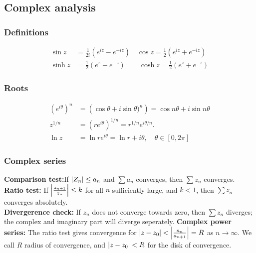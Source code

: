 \documentclass[a4paper, 10pt]{article}
\begin{document}
\tiny
\begin{multicols*}{3}
\begin{mdframed}
\subsection*{Complex analysis}
\end{mdframed}
\subsubsection*{Definitions}
\begin{align*}
  \sin{z} &= \frac{1}{2i}\left(e^{iz}-e^{-iz}\right)\quad
  \cos{z} = \frac{1}{2}\left(e^{iz}+e^{-iz}\right)\\
  \sinh{z} &= \frac{1}{2}\left(e^{z}-e^{-z}\right)\qquad
  \cosh{z} = \frac{1}{2}\left(e^{z}+e^{-z}\right)
\end{align*}

\subsubsection*{Roots}
\begin{align*}
  \left(e^{i\theta}\right)^n &= \left(\cos{\theta} + i \sin{\theta})^n\right) = \cos{n\theta} + i\sin{n\theta}\\
  z^{1/n} &= \left(re^{i\theta}\right)^{1/n} = r^{1/n}e^{i\theta/n}.\\
  \ln{z} &= \ln{re^{i\theta}} = \ln{r} + i\theta, \quad \theta \in [0, 2\pi]
\end{align*}


\subsubsection*{Complex series}
\textbf{Comparison test:}If $\abs{Z_n} \leq a_n$ and $\sum a_n$ converges, then $\sum z_n$ converges.\\
\textbf{Ratio test:} If $\abs{\frac{z_{n+1}}{z_n}} \leq k$ for all $n$ sufficiently large, and $k<1$, then $\sum z_n$ converges absolutely.\\
\textbf{Divergerence check:} If $z_n$ does not converge towards zero, then $\sum z_n$ diverges; the complex and imaginary part will diverge seperately.
\textbf{Complex power series:} The ratio test gives convergence for $\abs{z-z_0} < \abs{\frac{a_n}{a_{n+1}}} = R$ as $n\rightarrow \infty$. We call $R$ radius of convergence, and $\abs{z-z_0} < R$ for the disk of convergence.


\end{multicols*}
\end{document}
